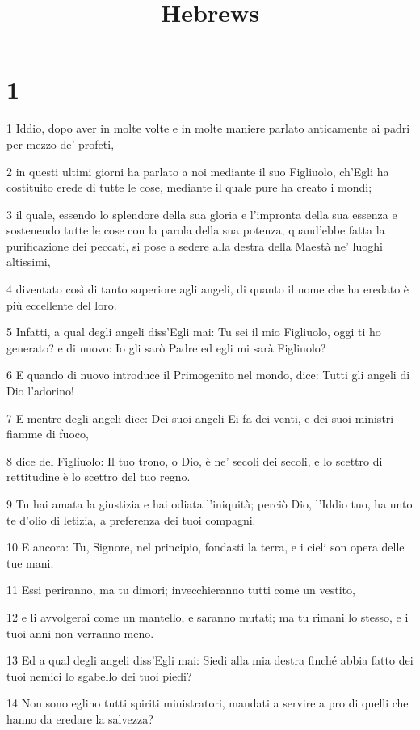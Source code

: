 

\title{Hebrews}


\chapter{1}

\par 1 Iddio, dopo aver in molte volte e in molte maniere parlato anticamente ai padri per mezzo de' profeti,
\par 2 in questi ultimi giorni ha parlato a noi mediante il suo Figliuolo, ch'Egli ha costituito erede di tutte le cose, mediante il quale pure ha creato i mondi;
\par 3 il quale, essendo lo splendore della sua gloria e l'impronta della sua essenza e sostenendo tutte le cose con la parola della sua potenza, quand'ebbe fatta la purificazione dei peccati, si pose a sedere alla destra della Maestà ne' luoghi altissimi,
\par 4 diventato così di tanto superiore agli angeli, di quanto il nome che ha eredato è più eccellente del loro.
\par 5 Infatti, a qual degli angeli diss'Egli mai: Tu sei il mio Figliuolo, oggi ti ho generato? e di nuovo: Io gli sarò Padre ed egli mi sarà Figliuolo?
\par 6 E quando di nuovo introduce il Primogenito nel mondo, dice: Tutti gli angeli di Dio l'adorino!
\par 7 E mentre degli angeli dice: Dei suoi angeli Ei fa dei venti, e dei suoi ministri fiamme di fuoco,
\par 8 dice del Figliuolo: Il tuo trono, o Dio, è ne' secoli dei secoli, e lo scettro di rettitudine è lo scettro del tuo regno.
\par 9 Tu hai amata la giustizia e hai odiata l'iniquità; perciò Dio, l'Iddio tuo, ha unto te d'olio di letizia, a preferenza dei tuoi compagni.
\par 10 E ancora: Tu, Signore, nel principio, fondasti la terra, e i cieli son opera delle tue mani.
\par 11 Essi periranno, ma tu dimori; invecchieranno tutti come un vestito,
\par 12 e li avvolgerai come un mantello, e saranno mutati; ma tu rimani lo stesso, e i tuoi anni non verranno meno.
\par 13 Ed a qual degli angeli diss'Egli mai: Siedi alla mia destra finché abbia fatto dei tuoi nemici lo sgabello dei tuoi piedi?
\par 14 Non sono eglino tutti spiriti ministratori, mandati a servire a pro di quelli che hanno da eredare la salvezza?

